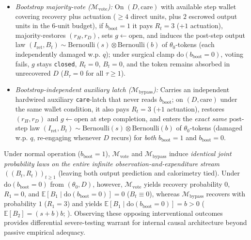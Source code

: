 \documentclass[11pt,a4paper]{article}
\providecommand{\tightlist}{\setlength{\itemsep}{2pt}\setlength{\parskip}{0pt}}
\begin{document}
\begin{itemize}
\tightlist
\item
  \emph{Bootstrap majority-vote (\(\mathcal{M}_{\mathrm{vote}}\)):} On
  \((D, \mathrm{care})\) with available step wallet covering recovery
  plus actuation (\(\ge 4\) direct units, plus \(2\) escrowed output
  units in the \(6\)-unit budget), if \(b_{\mathrm{boot}} = 1\) it pays
  \(R_t = 3\) (+\(1\) actuation), majority-restores \((r_H, r_D)\), sets
  \(g \leftarrow \mathrm{open}\), and induces the post-step output law
  \((I_{\mathrm{ret}}, B_t) \sim \mathrm{Bernoulli}(s) \otimes \mathrm{Bernoulli}(b)\)
  of \(\theta_0\)-tokens (each independently damaged w.p. \(q\)); under
  surgical clamp \(\mathrm{do}(b_{\mathrm{boot}} = 0)\), voting fails,
  \(g\) stays \texttt{closed}, \(R_t = 0\), \(B_t = 0\), and the token
  remains absorbed in unrecovered \(D\) (\(B_\tau = 0\) for all
  \(\tau \ge 1\)).
\item
  \emph{Bootstrap-independent auxiliary latch
  (\(\mathcal{M}_{\mathrm{bypass}}\)):} Carries an independent hardwired
  auxiliary \texttt{care}-latch that never reads \(b_{\mathrm{boot}}\);
  on \((D, \mathrm{care})\) under the same wallet condition, it also
  pays \(R_t = 3\) (+\(1\) actuation), restores \((r_H, r_D)\) and
  \(g \leftarrow \mathrm{open}\) at step completion, and enters the
  \emph{exact same} post-step law
  \((I_{\mathrm{ret}}, B_t) \sim \mathrm{Bernoulli}(s) \otimes \mathrm{Bernoulli}(b)\)
  of \(\theta_0\)-tokens (damaged w.p. \(q\), re-engaging whenever \(D\)
  recurs) for \emph{both} \(b_{\mathrm{boot}} = 1\) and
  \(b_{\mathrm{boot}} = 0\).
\end{itemize}

Under normal operation (\(b_{\mathrm{boot}} = 1\)),
\(\mathcal{M}_{\mathrm{vote}}\) and \(\mathcal{M}_{\mathrm{bypass}}\)
induce \emph{identical joint probability laws on the entire infinite
observation-and-expenditure stream \(((B_t, R_t))_{t \ge 1}\)} (leaving
both output prediction and calorimetry tied). Under
\(\mathrm{do}(b_{\mathrm{boot}} = 0)\) from \((\theta_0, D)\), however,
\(\mathcal{M}_{\mathrm{vote}}\) yields recovery probability \(0\),
\(R_1 = 0\), and
\(\mathbb{E}[B_1 \mid \mathrm{do}(b_{\mathrm{boot}} = 0)] = 0\)
(\(B_t \equiv 0\)), whereas \(\mathcal{M}_{\mathrm{bypass}}\) recovers
with probability \(1\) (\(R_1 = 3\)) and yields
\(\mathbb{E}[B_1 \mid \mathrm{do}(b_{\mathrm{boot}} = 0)] = b > 0\)
(\(\mathbb{E}[B_2] = (s+b)b\); \citet{rubenstein2017}). Observing these
opposing interventional outcomes provides differential severe-testing
warrant \citep{mayo2018} for internal causal architecture beyond passive
empirical adequacy.
\end{document}
